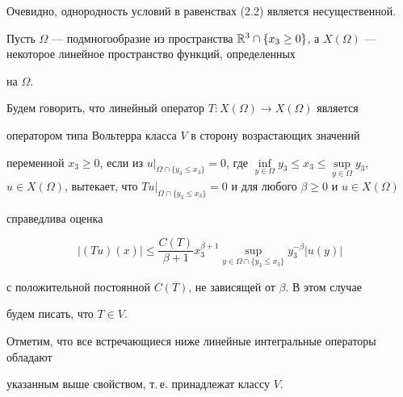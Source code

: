 \begin{note}


Очевидно, однородность условий в равенствах (2.2) является несущественной.


\end{note}





Пусть $\Omega$ --- подмногообразие из пространства $\Bbb{R}^3 \cap \{x_3 \geq


0\}$, а $X(\Omega)$ --- некоторое линейное пространство функций, определенных


на $\Omega$.


Будем говорить, что линейный оператор $T: X(\Omega) \to X(\Omega)$ является


оператором типа Вольтерра класса $V$ в сторону возрастающих значений


переменной $x_3 \geq 0$, если из $u \big|_{\Omega \cap \{y_3 \leq x_3 \}}


=0$, где $\inf\limits_{y \in \Omega}y_3 \leq x_3 \leq \sup\limits_{y \in


\Omega}y_3$, $u \in X(\Omega)$, вытекает, что $Tu \big |_{\Omega


\cap \{y_3 \leq x_3 \}}=0$ и для любого $\beta \geq 0$ и $u \in X(\Omega)$


справедлива оценка




\begin{equation}


|(Tu)(x)|\leq \frac {C(T)}{\beta +1}x_3^{\beta+1}


\sup_{y \in \Omega \cap \{y_3 \leq x_3 \}}y_3^{-\beta}|u(y)|


\end{equation}


с положительной постоянной $C(T)$, не зависящей от $\beta$. В этом случае


будем писать, что $T \in V$.





Отметим, что все встречающиеся ниже линейные интегральные операторы обладают


указанным выше свойством, т.\,е. принадлежат классу $V$.





